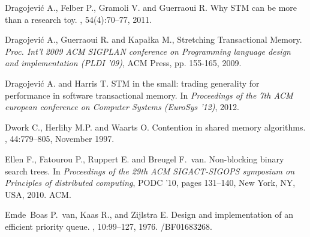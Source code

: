 \begin{thebibliography}{99}
{%



Dragojevi\'{c} A., Felber P., Gramoli V. and Guerraoui R.
\newblock Why {STM} can be more than a research toy.
, 54(4):70--77, 2011.




Dragojevi\'{c} A., Guerraoui R. and  Kapa\l{}ka M., 
Stretching Transactional Memory. 
{\it  Proc. Int'l  2009 ACM SIGPLAN conference on Programming
 language design and implementation (PLDI '09)},  
ACM Press, pp. 155-165,  2009. 


Dragojevi\'{c} A. and Harris T. 
\newblock STM in the small: trading generality for performance in software transactional memory.
\newblock In {\em Proceedings of the 7th ACM european conference on Computer Systems (EuroSys '12)}, 2012.



Dwork C., Herlihy M.P. and Waarts O.
\newblock Contention in shared memory algorithms.
, 44:779--805, November 1997.


Ellen F., Fatourou P., Ruppert E. and Breugel F.~van.
\newblock Non-blocking binary search trees.
\newblock In {\em Proceedings of the 29th ACM SIGACT-SIGOPS symposium on
  Principles of distributed computing}, PODC '10, pages 131--140, New York, NY,
  USA, 2010. ACM.


Emde~Boas P.~van, Kaas R., and Zijlstra E.
\newblock Design and implementation of an efficient priority queue.
, 10:99--127, 1976.
/BF01683268.




}
\end{thebibliography}
